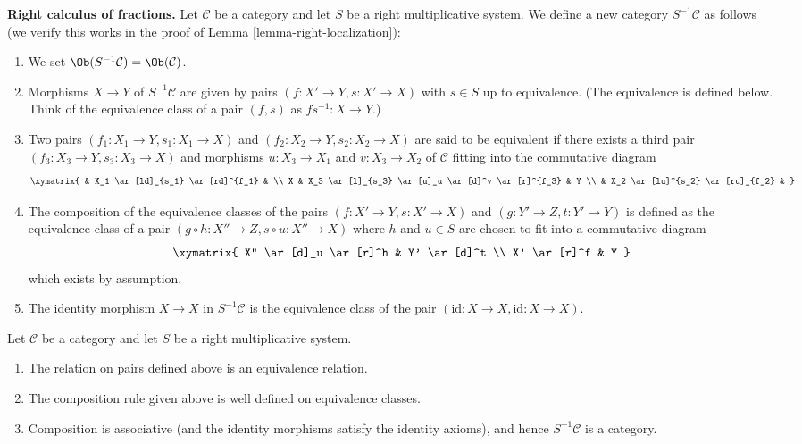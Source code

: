 \noindent
{\bf Right calculus of fractions.}
Let $\mathcal{C}$ be a category and let $S$ be a right multiplicative
system. We define a new category $S^{-1}\mathcal{C}$ as follows
(we verify this works in the proof of
Lemma \ref{lemma-right-localization}):
\begin{enumerate}
\item We set $\Ob(S^{-1}\mathcal{C}) = \Ob(\mathcal{C})$.
\item Morphisms $X \to Y$ of $S^{-1}\mathcal{C}$ are given by pairs
$(f : X' \to Y, s : X' \to X)$ with $s \in S$ up to equivalence.
(The equivalence is defined below. Think of the equivalence class
of a pair $(f, s)$ as $fs^{-1} : X \to Y$.)
\item Two pairs $(f_1 : X_1 \to Y, s_1 : X_1 \to X)$ and
$(f_2 : X_2 \to Y, s_2 : X_2 \to X)$ are said to be equivalent
if there exists a third pair $(f_3 : X_3 \to Y, s_3 : X_3 \to X)$
and morphisms $u : X_3 \to X_1$ and $v : X_3 \to X_2$ of $\mathcal{C}$
fitting into the commutative diagram
$$
\xymatrix{
 & X_1 \ar[ld]_{s_1} \ar[rd]^{f_1} & \\
X &
X_3 \ar[l]_{s_3} \ar[u]_u \ar[d]^v \ar[r]^{f_3} &
Y \\
& X_2 \ar[lu]^{s_2} \ar[ru]_{f_2} &
}
$$
\item The composition of the equivalence classes of the pairs
$(f : X' \to Y, s : X' \to X)$ and $(g : Y' \to Z, t : Y' \to Y)$
is defined as the equivalence class of a pair
$(g \circ h : X'' \to Z, s \circ u : X'' \to X)$
where $h$ and $u \in S$ are chosen to fit into a commutative diagram
$$
\xymatrix{
X'' \ar[d]_u \ar[r]^h & Y' \ar[d]^t \\
X' \ar[r]^f & Y
}
$$
which exists by assumption.
\item The identity morphism $X \to X$ in $S^{-1} \mathcal{C}$ is the
equivalence class of the pair $(\text{id} : X \to X,
\text{id} : X \to X)$.
\end{enumerate}

\begin{lemma}
\label{lemma-right-localization}
Let $\mathcal{C}$ be a category and let $S$ be a right multiplicative
system.
\begin{enumerate}
\item The relation on pairs defined above is an equivalence relation.
\item The composition rule given above is well defined on equivalence
classes.
\item Composition is associative (and the identity morphisms satisfy
the identity axioms), and hence $S^{-1}\mathcal{C}$ is a category.
\end{enumerate}
\end{lemma}

